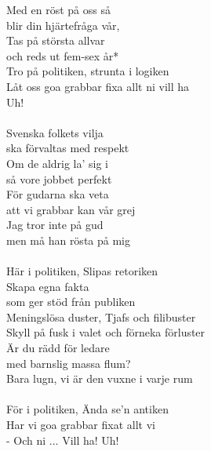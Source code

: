 \documentclass[a5paper,15pt]{article}
\begin{document}
Med en röst på oss så \\blir din hjärtefråga vår,\\
Tas på största allvar \\och reds ut fem-sex år*\\
Tro på politiken, strunta i logiken\\
Låt oss goa grabbar fixa allt ni vill ha\\
Uh!\\
\\
Svenska folkets vilja \\ska förvaltas med respekt\\
Om de aldrig la' sig i \\så vore jobbet perfekt\\
För gudarna ska veta \\att vi grabbar kan vår grej\\
Jag tror inte på gud \\men må han rösta på mig\\
\\
Här i politiken, Slipas retoriken\\
Skapa egna fakta \\som ger stöd från publiken\\
Meningslösa duster, Tjafs och filibuster\\
Skyll på fusk i valet och förneka förluster\\
Är du rädd för ledare \\med barnslig massa flum?\\
Bara lugn, vi är den vuxne i varje rum\\
\\
För i politiken, 
Ända se'n antiken\\
Har vi goa grabbar fixat allt vi\\
- Och ni 
... Vill ha! 
Uh!
\\
\end{document}
